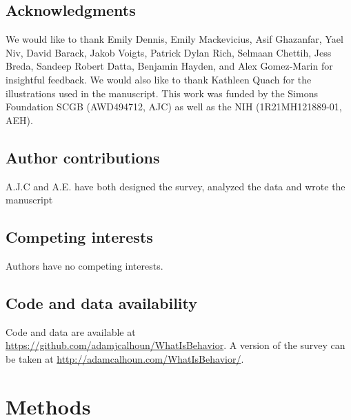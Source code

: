 \documentclass[a4paper, 11pt]{article}
\begin{document}
\subsection*{Acknowledgments}
We would like to thank Emily Dennis, Emily Mackevicius, Asif Ghazanfar, Yael Niv, David Barack, Jakob Voigts, Patrick Dylan Rich, Selmaan Chettih, Jess Breda, Sandeep Robert Datta, Benjamin Hayden, and Alex Gomez-Marin for insightful feedback. We would also like to thank Kathleen Quach for the illustrations used in the manuscript. This work was funded by the Simons Foundation SCGB (AWD494712, AJC) as well as the NIH (1R21MH121889-01, AEH).

\subsection*{Author contributions}
A.J.C and A.E. have both designed the survey, analyzed the data and wrote the manuscript

\subsection*{Competing interests}
Authors have no competing interests.

\subsection*{Code and data availability}
Code and data are available at \href{https://github.com/adamjcalhoun/WhatIsBehavior}{https://github.com/adamjcalhoun/WhatIsBehavior}. A version of the survey can be taken at \href{http://adamcalhoun.com/WhatIsBehavior/}{http://adamcalhoun.com/WhatIsBehavior/}.

\section*{Methods}
\end{document}
